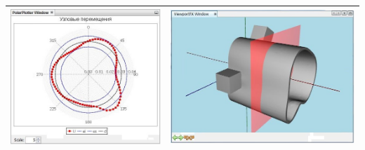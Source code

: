 \documentclass[14pt,oneside,final]{extreport}
\begin{document}
\begin{table}[]
{{\begin{tabu}[]{|c|c|}
					\includegraphics[scale=0.55]{img/plane-position-test3} & \includegraphics[scale=0.55]{img/plane-position-test3-model}  \\ 
					\hline
				\end{tabu}
			}
	}\end{table}
	
\end{document}

